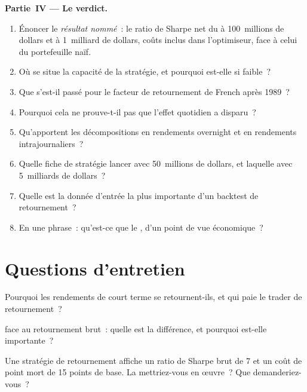 \begin{problem}
\medskip\noindent\textbf{Partie~IV --- Le verdict.}
\begin{enumerate}[resume]
\item Énoncer le \emph{résultat nommé}~: le ratio de Sharpe net du  à 100~millions de dollars et à 1~milliard de dollars, coûts inclus dans l'optimiseur, face
à celui du portefeuille naïf.
\item Où se situe la capacité de la stratégie, et pourquoi est-elle si faible~?
\item Que s'est-il passé pour le facteur de retournement de French après 1989~?
\item Pourquoi cela ne prouve-t-il pas que l'effet quotidien a disparu~?
\item Qu'apportent les décompositions en rendements overnight et en rendements intrajournaliers~?
\item Quelle fiche de stratégie lancer avec 50~millions de dollars, et laquelle avec 5~milliards de dollars~?
\item Quelle est la donnée d'entrée la plus importante d'un backtest de retournement~?
\item En une phrase~: qu'est-ce que le , d'un point de vue économique~?
\end{enumerate}
\end{problem}

\section{Questions d'entretien}

\begin{interviewq}\label{iq:s1:short-term-reversal:1}
Pourquoi les rendements de court terme se retournent-ils, et qui paie le trader de retournement~?
\end{interviewq}

\begin{interviewq}\label{iq:s1:short-term-reversal:2}
 face au retournement brut~: quelle est la différence, et pourquoi est-elle importante~?
\end{interviewq}

\begin{interviewq}\label{iq:s1:short-term-reversal:3}
Une stratégie de retournement affiche un ratio de Sharpe brut de 7 et un coût de point mort de 15 points de base. La mettriez-vous en œuvre~? Que demanderiez-vous~?
\end{interviewq}

